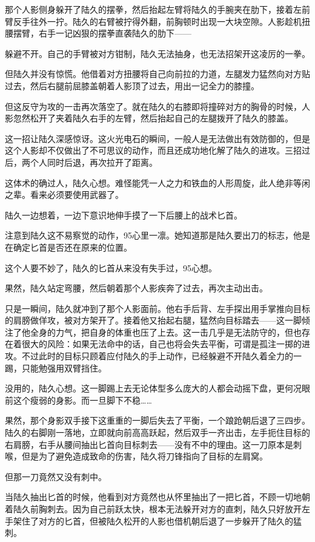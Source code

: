 那个人影侧身躲开了陆久的摆拳，然后抬起左臂将陆久的手腕夹在肋下，接着左前臂反手往外一拧。陆久的右臂被拧得外翻，前胸顿时出现一大块空隙。人影趁机扭腰摆臂，右手一记凶狠的摆拳直袭陆久的肋下——

躲避不开。自己的手臂被对方钳制，陆久无法抽身，也无法招架开这凌厉的一拳。

但陆久并没有惊慌。他借着对方扭腰将自己向前拉的力道，左腿发力猛然向对方贴过去，然后右腿前屈膝盖朝着人影顶了过去，用出一记全力的膝撞。

但这反守为攻的一击再次落空了。就在陆久的右膝即将撞碎对方的胸骨的时候，人影忽然松开了夹着陆久右手的左臂，然后抬起自己的左腿拨开了陆久的膝盖。

这一招让陆久深感惊讶。这火光电石的瞬间，一般人是无法做出有效防御的，但是这个人影却不仅做出了不可思议的动作，而且还成功地化解了陆久的进攻。三招过后，两个人同时后退，再次拉开了距离。

这体术的确过人，陆久心想。难怪能凭一人之力和铁血的人形周旋，此人绝非等闲之辈。看来必须要使用武器了。

陆久一边想着，一边下意识地伸手摸了一下后腰上的战术匕首。

注意到陆久这不易察觉的动作，95心里一凛。她知道那是陆久要出刀的标志，他是在确定匕首是否还在原来的位置。

这个人要不妙了，陆久的匕首从来没有失手过，95心想。

果然，陆久站定弯腰，然后朝着那个人影疾奔了过去，再次主动出击。

只是一瞬间，陆久就冲到了那个人影面前。他右手后背、左手探出用手掌推向目标的肩膀做佯攻，被对方架开了。接着他又抬起右腿，猛然向目标踏去——这一脚倾注了他全身的力气，把自身的体重也压了上去。这一击几乎是无法防守的，但也存在着很大的风险：如果无法命中的话，自己也将会失去平衡，可谓是孤注一掷的进攻。不过此时的目标只顾着应付陆久的手上动作，已经躲避不开陆久着全力的一踢，只能勉强用双臂挡住。

没用的，陆久心想。这一脚踢上去无论体型多么庞大的人都会动摇下盘，更何况眼前这个瘦弱的身影。而一旦脚下不稳……

果然，那个身影双手接下这重重的一脚后失去了平衡，一个踉跄朝后退了三四步。陆久的右脚刚一落地，立即就向前高高跃起，然后双手一齐出击，左手扼住目标的右肩膀，右手从腰间抽出匕首向目标刺去——没有不中的理由。这一刀原本是刺喉，但是为了避免造成致命的伤害，陆久将刀锋指向了目标的左肩窝。

但那一刀竟然又没有刺中。

当陆久抽出匕首的时候，他看到对方竟然也从怀里抽出了一把匕首，不顾一切地朝着陆久前胸刺去。因为自己前跃太快，根本无法躲开对方的直刺，陆久只好放开左手架住了对方的匕首，但被陆久松开的人影也借机朝后退了一步躲开了陆久的猛刺。

